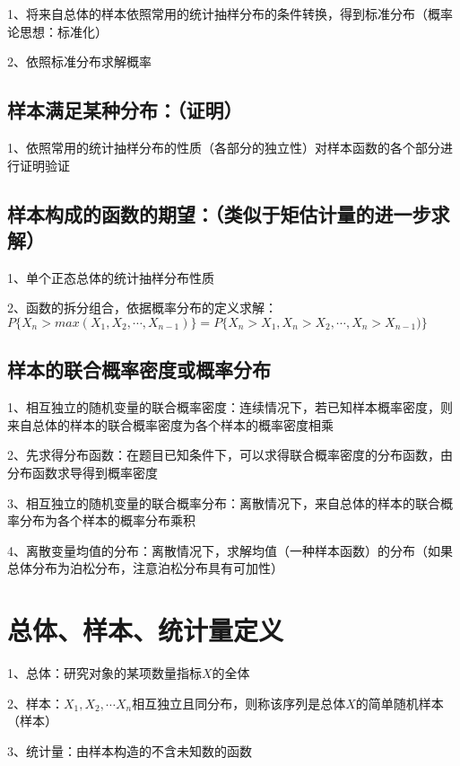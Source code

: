 1、将来自总体的样本依照常用的统计抽样分布的条件转换，得到标准分布（概率论思想：标准化）

2、依照标准分布求解概率



\subsection{样本满足某种分布：（证明）}

1、依照常用的统计抽样分布的性质（各部分的独立性）对样本函数的各个部分进行证明验证



\subsection{样本构成的函数的期望：（类似于矩估计量的进一步求解）}

1、单个正态总体的统计抽样分布性质

2、函数的拆分组合，依据概率分布的定义求解：$P\{ X_n > max(X_1,X_2,\cdots,X_{n-1})\} = P\{ X_n > X_1,X_n >X_2,\cdots,X_n >X_{n-1})\}$



\subsection{样本的联合概率密度或概率分布}

1、相互独立的随机变量的联合概率密度：连续情况下，若已知样本概率密度，则来自总体的样本的联合概率密度为各个样本的概率密度相乘

2、先求得分布函数：在题目已知条件下，可以求得联合概率密度的分布函数，由分布函数求导得到概率密度

3、相互独立的随机变量的联合概率分布：离散情况下，来自总体的样本的联合概率分布为各个样本的概率分布乘积

4、离散变量均值的分布：离散情况下，求解均值（一种样本函数）的分布（如果总体分布为泊松分布，注意泊松分布具有可加性）

\section{总体、样本、统计量定义}

1、总体：研究对象的某项数量指标$X$的全体

2、样本：$X_1,X_2,\cdots X_n$相互独立且同分布，则称该序列是总体$X$的简单随机样本（样本）

3、统计量：由样本构造的不含未知数的函数

